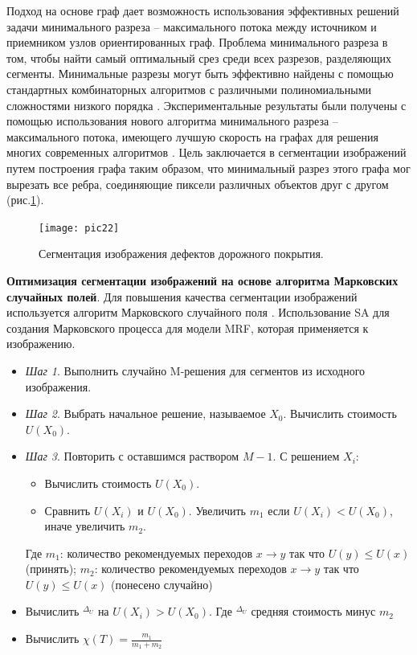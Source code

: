 \documentclass[a4paper,14pt]{extreport}
\begin{document}
Подход на основе граф дает возможность использования эффективных решений задачи минимального разреза -- максимального потока между источником и приемником узлов ориентированных граф. Проблема минимального разреза в том, чтобы найти самый оптимальный срез среди всех разрезов, разделяющих сегменты. Минимальные разрезы могут быть эффективно найдены с помощью стандартных комбинаторных алгоритмов с различными полиномиальными сложностями низкого порядка \cite{h137}. Экспериментальные результаты были получены с помощью использования нового алгоритма минимального разреза -- максимального потока, имеющего лучшую скорость на графах для решения многих современных алгоритмов \cite{h138}. Цель заключается в сегментации изображений путем построения графа таким образом, что минимальный разрез этого графа мог вырезать все ребра, соединяющие пиксели различных объектов друг с другом (рис.\ref{pic22}).
\begin{figure}[ht!]
\centering
\texttt{[image: pic22]}
\caption{Сегментация изображения дефектов дорожного покрытия.}
	\label{pic22}
		\end{figure} 
		
\textbf{Оптимизация сегментации изображений на основе алгоритма Марковских случайных полей}. Для повышения качества сегментации изображений используется алгоритм Марковского случайного поля \cite{h134}. Использование SA \cite{h139, h140} для создания Марковского процесса для модели MRF, которая применяется к изображению.


\begin{itemize}
	\item \textit{Шаг 1}. Выполнить случайно M-решения для сегментов из исходного изображения.
	\item \textit{Шаг 2}. Выбрать начальное решение, называемое $X_0$. Вычислить стоимость $U \left(X_0\right)$.
	\item \textit{Шаг 3}. Повторить с оставшимся раствором $M-1$. С решением $X_i$:
	
	\begin{itemize}
		\item Вычислить стоимость $U\left(X_0\right)$.
		\item Сравнить $U\left(X_i\right)$ и $U\left(X_0\right)$. Увеличить $m_1$ если $U\left(X_i\right) < U\left(X_0\right)$, иначе увеличить $m_2$.
	\end{itemize}
Где  $m_1$: количество рекомендуемых переходов $x \rightarrow y$ так что $U\left(y\right) \leq U\left(x\right)$ (принять); 
	   $m_2$: количество рекомендуемых переходов $x \rightarrow y$ так что $U\left(y\right) \leq U\left(x\right)$ (понесено случайно) 
	\item Вычислить $^{\Delta_U}$ на $U\left(X_i\right) > U\left(X_0\right) $. 
	Где $^{\Delta_U}$ средняя стоимость минус $m_2$
	\item Вычислить $\chi \left(T\right) = \frac{m_1}{m_1+m_2}$
\end{itemize}
\end{document}
